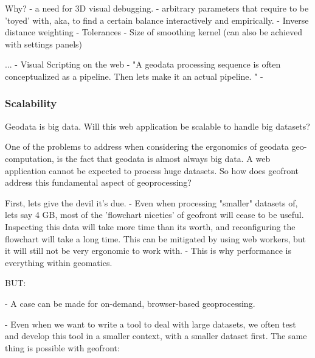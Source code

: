 Why? 
- a need for 3D visual debugging. 
- arbitrary parameters that require to be 'toyed' with, aka, to find a certain balance interactively and empirically.
  - Inverse distance weighting
  - Tolerances
  - Size of smoothing kernel
(can also be achieved with settings panels)

...
- Visual Scripting on the web - "A geodata processing sequence is often conceptualized as a pipeline. Then lets make it an actual pipeline. "
- 





\subsubsection{Scalability}

Geodata is big data. Will this web application be scalable to handle big datasets?

One of the problems to address when considering the ergonomics of geodata geo-computation, is the fact that geodata is almost always big data. A web application cannot be expected to process huge datasets. So how does geofront address this fundamental aspect of geoprocessing? 

First, lets give the devil it's due. 
- Even when processing "smaller" datasets of, lets say 4 GB, most of the 'flowchart niceties' of geofront will cease to be useful. Inspecting this data will take more time than its worth, and reconfiguring the flowchart will take a long time. This can be mitigated by using web workers, but it will still not be very ergonomic to work with. 
- This is why performance is everything within geomatics.

BUT: 

- A case can be made for on-demand, browser-based geoprocessing. 

- Even when we want to write a tool to deal with large datasets, we often test and develop this tool in a smaller context, with a smaller dataset first. The same thing is possible with geofront: 

